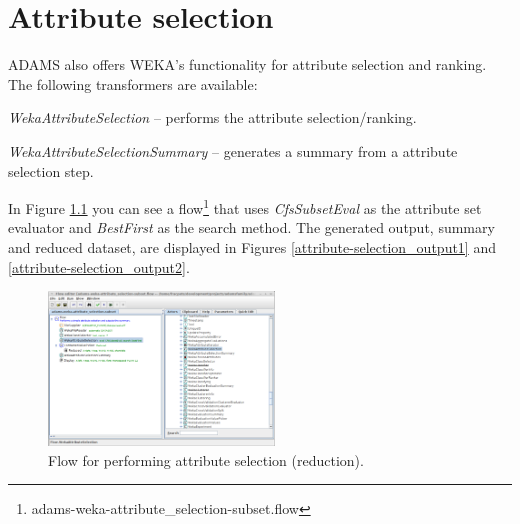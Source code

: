 %

\chapter{Attribute selection}
\label{attribute_selection}
ADAMS also offers WEKA's functionality for attribute selection and ranking.
The following transformers are available:
\begin{tight_itemize}
	\item \textit{WekaAttributeSelection} -- performs the attribute 
	selection/ranking.
	\item \textit{WekaAttributeSelectionSummary} -- generates a summary from
	a attribute selection step.
\end{tight_itemize}

In Figure \ref{attribute-selection_flow} you can see a flow\footnote{adams-weka-attribute\_selection-subset.flow} 
that uses \textit{CfsSubsetEval} as the attribute set evaluator and \textit{BestFirst}
as the search method. The generated output, summary and reduced dataset,
are displayed in Figures \ref{attribute-selection_output1} and 
\ref{attribute-selection_output2}.

\begin{figure}[htb]
  \centering
  \includegraphics[width=6.0cm]{images/attribute-selection_flow.png}
  \caption{Flow for performing attribute selection (reduction).}
  \label{attribute-selection_flow}
\end{figure}

